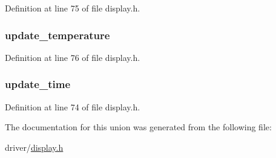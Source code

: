 \-Definition at line 75 of file display.\-h.

\hypertarget{unions__display__flags_a49b58805245fc6fb2a9dd89ab9a41ef4}{
\subsubsection[{update\-\_\-temperature}]{ {\bf update\-\_\-temperature}}}\label{unions__display__flags_a49b58805245fc6fb2a9dd89ab9a41ef4}


\-Definition at line 76 of file display.\-h.

\hypertarget{unions__display__flags_a0fe35dbb92aa1da6230872d35273a99b}{
\subsubsection[{update\-\_\-time}]{ {\bf update\-\_\-time}}}\label{unions__display__flags_a0fe35dbb92aa1da6230872d35273a99b}


\-Definition at line 74 of file display.\-h.



\-The documentation for this union was generated from the following file\-:\begin{DoxyCompactItemize}
\item 
driver/\hyperlink{display_8h}{display.\-h}\end{DoxyCompactItemize}
